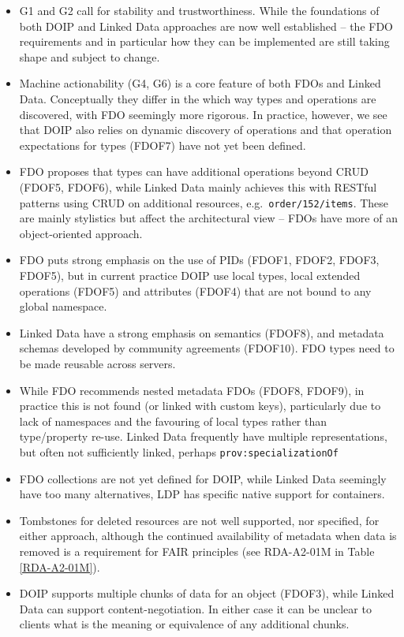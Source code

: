 \begin{itemize}
\tightlist
\item
  G1 and G2 call for stability and trustworthiness. While the foundations of both DOIP and Linked Data approaches are now well established -- the FDO requirements and in particular how they can be implemented are still taking shape and subject to change.
\item
  Machine actionability (G4, G6) is a core feature of both FDOs and Linked Data. Conceptually they differ in the which way types and operations are discovered, with FDO seemingly more rigorous. In practice, however, we see that DOIP also relies on dynamic discovery of operations and that operation expectations for types (FDOF7) have not yet been defined.
\item
  FDO proposes that types can have additional operations beyond CRUD (FDOF5, FDOF6), while Linked Data mainly achieves this with RESTful patterns using CRUD on additional resources, e.g.~\texttt{order/152/items}. These are mainly stylistics but affect the architectural view -- FDOs have more of an object-oriented approach.
\item
  FDO puts strong emphasis on the use of PIDs (FDOF1, FDOF2, FDOF3, FDOF5), but in current practice DOIP use local types, local extended operations (FDOF5) and attributes (FDOF4) that are not bound to any global namespace.
\item
  Linked Data have a strong emphasis on semantics (FDOF8), and metadata schemas developed by community agreements (FDOF10). FDO types need to be made reusable across servers.
\item
  While FDO recommends nested metadata FDOs (FDOF8, FDOF9), in practice this is not found (or linked with custom keys), particularly due to lack of namespaces and the favouring of local types rather than type/property re-use. Linked Data frequently have multiple representations, but often not sufficiently linked, perhaps \texttt{prov:specializationOf} \cite{w3-prov-o}
\item
  FDO collections are not yet defined for DOIP, while Linked Data seemingly have too many alternatives, LDP has specific native support for containers.
\item
  Tombstones for deleted resources are not well supported, nor specified, for either approach, although the continued availability of metadata when data is removed is a requirement for FAIR principles (see RDA-A2-01M in Table \vref{RDA-A2-01M}).
\item
  DOIP supports multiple chunks of data for an object (FDOF3), while Linked Data can support content-negotiation. In either case it can be unclear to clients what is the meaning or equivalence of any additional chunks.
\end{itemize}

